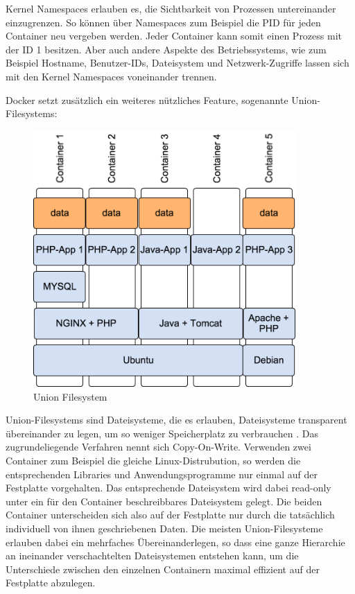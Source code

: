 Kernel Namespaces \citep[Vgl.][S. 3]{Schee14} erlauben es, die Sichtbarkeit von Prozessen untereinander einzugrenzen. So können über Namespaces zum Beispiel die \ac{PID} für jeden Container neu vergeben werden. Jeder Container kann somit einen Prozess mit der ID 1 besitzen. Aber auch andere Aspekte des Betriebssystems, wie zum Beispiel Hostname, Benutzer-IDs, Dateisystem und Netzwerk-Zugriffe lassen sich mit den Kernel Namespaces voneinander trennen.

Docker setzt zusätzlich ein weiteres nützliches Feature, sogenannte Union-Filesystems:

\begin{figure}[!ht]
  \begin{center}
    \includegraphics[width=10cm]{bilder/UnionFilesystem.png}
    \caption{Union Filesystem}
    \label{Union Filesystem}
  \end{center}
\end{figure}

Union-Filesystems sind Dateisysteme, die es erlauben, Dateisysteme transparent übereinander zu legen, um so weniger Speicherplatz zu verbrauchen \citep[Vgl.][S. 3]{Schee14}. Das zugrundeliegende Verfahren nennt sich Copy-On-Write. Verwenden zwei Container zum Beispiel die gleiche Linux-Distrubution, so werden die entsprechenden Libraries und Anwendungsprogramme nur einmal auf der Festplatte vorgehalten. Das entsprechende Dateisystem wird dabei read-only unter ein für den Container beschreibbares Dateisystem gelegt. Die beiden Container unterscheiden sich also auf der Festplatte nur durch die tatsächlich individuell von ihnen geschriebenen Daten. Die meisten Union-Filesysteme erlauben dabei ein mehrfaches Übereinanderlegen, so dass eine ganze Hierarchie an ineinander verschachtelten Dateisystemen entstehen kann, um die Unterschiede zwischen den einzelnen Containern maximal effizient auf der Festplatte abzulegen.

